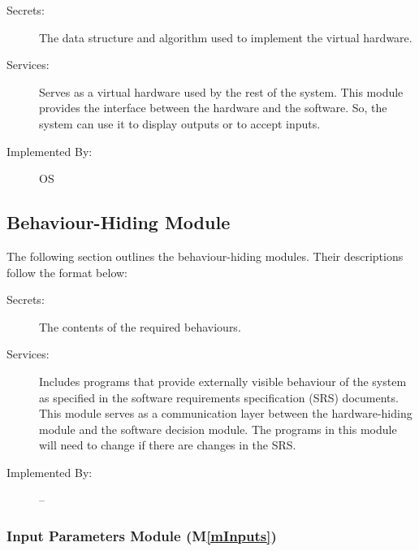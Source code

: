 \documentclass[12pt, titlepage]{article}
\newcommand{\mref}[1]{M\ref{#1}}
\begin{document}
\begin{description}
\item[Secrets:]The data structure and algorithm used to implement the virtual
  hardware.
\item[Services:]Serves as a virtual hardware used by the rest of the
  system. This module provides the interface between the hardware and the
  software. So, the system can use it to display outputs or to accept inputs.
\item[Implemented By:] OS
\end{description}

\subsection{Behaviour-Hiding Module}
The following section outlines the behaviour-hiding modules. Their 
descriptions follow the format below: 

\begin{description}
\item[Secrets:]The contents of the required behaviours.
\item[Services:]Includes programs that provide externally visible behaviour of
  the system as specified in the software requirements specification (SRS)
  documents. This module serves as a communication layer between the
  hardware-hiding module and the software decision module. The programs in this
  module will need to change if there are changes in the SRS.
\item[Implemented By:] --
\end{description}

%

\subsubsection{Input Parameters Module (\mref{mInputs})}
\end{document}
